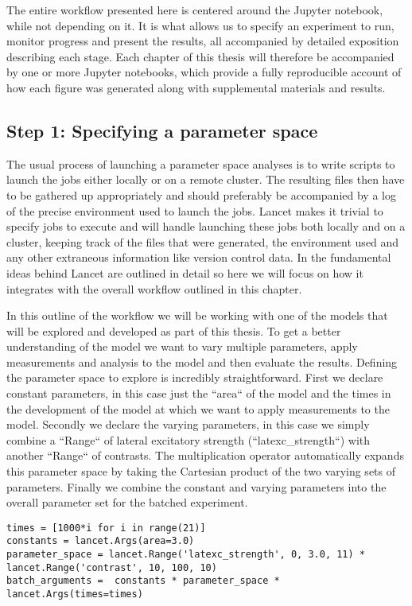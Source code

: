 The entire workflow presented here is centered around the Jupyter
notebook, while not depending on it. It is what allows us to specify
an experiment to run, monitor progress and present the results, all
accompanied by detailed exposition describing each stage. Each chapter
of this thesis will therefore be accompanied by one or more Jupyter
notebooks, which provide a fully reproducible account of how each
figure was generated along with supplemental materials and results.

\subsection{Step 1: Specifying a parameter space}

The usual process of launching a parameter space analyses is to write
scripts to launch the jobs either locally or on a remote cluster. The
resulting files then have to be gathered up appropriately and should
preferably be accompanied by a log of the precise environment used to
launch the jobs. Lancet makes it trivial to specify jobs to execute
and will handle launching these jobs both locally and on a cluster,
keeping track of the files that were generated, the environment used
and any other extraneous information like version control data. In
\cite{Stevens2013a} the fundamental ideas behind Lancet are outlined
in detail so here we will focus on how it integrates with the overall
workflow outlined in this chapter.

In this outline of the workflow we will be working with one of the
models that will be explored and developed as part of this thesis. To
get a better understanding of the model we want to vary multiple
parameters, apply measurements and analysis to the model and then
evaluate the results. Defining the parameter space to explore is
incredibly straightforward. First we declare constant parameters, in
this case just the ``area`` of the model and the times in the
development of the model at which we want to apply measurements to the
model. Secondly we declare the varying parameters, in this case we
simply combine a ``Range`` of lateral excitatory strength
(``latexc\_strength``) with another ``Range`` of contrasts. The
multiplication operator automatically expands this parameter space by
taking the Cartesian product of the two varying sets of
parameters. Finally we combine the constant and varying parameters
into the overall parameter set for the batched experiment.

\begin{minipage}{\linewidth}
\begin{lstlisting}
times = [1000*i for i in range(21)]
constants = lancet.Args(area=3.0)
parameter_space = lancet.Range('latexc_strength', 0, 3.0, 11) * lancet.Range('contrast', 10, 100, 10)
batch_arguments =  constants * parameter_space * lancet.Args(times=times)
\end{lstlisting}
\end{minipage}

